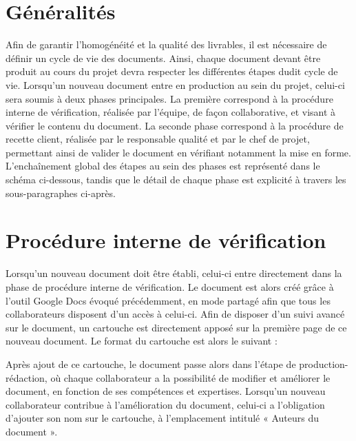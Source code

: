 
\section{Généralités}

Afin de garantir l’homogénéité et la qualité des livrables, il est nécessaire de définir un cycle de vie des documents. Ainsi, chaque document devant être produit au cours du projet devra respecter les différentes étapes dudit cycle de vie. Lorsqu’un nouveau document entre en production au sein du projet, celui-ci sera soumis à deux phases principales. La première correspond à la procédure interne de vérification, réalisée par l’équipe, de façon collaborative, et visant à vérifier le contenu du document. La seconde phase correspond à la procédure de recette client, réalisée par le responsable qualité et par le chef de projet, permettant ainsi de valider le document en vérifiant notamment la mise en forme. L’enchaînement global des étapes au sein des phases est représenté dans le schéma ci-dessous, tandis que le détail de chaque phase est explicité à travers les sous-paragraphes ci-après.


\section{Procédure interne de vérification}
    
Lorsqu’un nouveau document doit être établi, celui-ci entre directement dans la phase de procédure interne de vérification. Le document est alors créé grâce à l’outil Google Docs évoqué précédemment, en mode partagé afin que tous les collaborateurs disposent d’un accès à celui-ci. Afin de disposer d’un suivi avancé sur le document, un cartouche est directement apposé sur la première page de ce nouveau document. Le format du cartouche est alors le suivant : \\


Après ajout de ce cartouche, le document passe alors dans l’étape de production-rédaction, où chaque collaborateur a la possibilité de modifier et améliorer le document, en fonction de ses compétences et expertises. Lorsqu’un nouveau collaborateur contribue à l’amélioration du document, celui-ci a l’obligation d’ajouter son nom sur le cartouche, à l’emplacement intitulé « Auteurs du document ». \\
 
